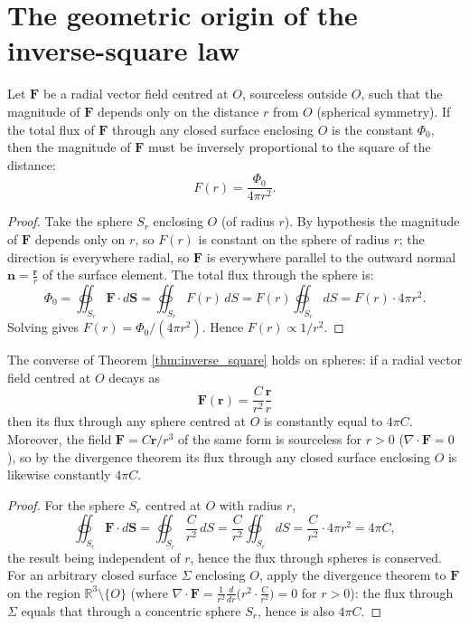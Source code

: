 \section{\texorpdfstring{The geometric origin of the inverse-square law}{The geometric origin of the inverse-square law}}

\begin{theorem}\label{thm:inverse_square}
Let $\mathbf{F}$ be a radial vector field centred at $O$, sourceless outside $O$, such that the magnitude of $\mathbf{F}$ depends only on the distance $r$ from $O$ (spherical symmetry). If the total flux of $\mathbf{F}$ through any closed surface enclosing $O$ is the constant $\Phi_0$, then the magnitude of $\mathbf{F}$ must be inversely proportional to the square of the distance:
\[F(r) = \frac{\Phi_0}{4\pi r^2}.\]
\end{theorem}

\begin{proof}
Take the sphere $S_r$ enclosing $O$ (of radius $r$). By hypothesis the magnitude of $\mathbf{F}$ depends only on $r$, so $F(r)$ is constant on the sphere of radius $r$; the direction is everywhere radial, so $\mathbf{F}$ is everywhere parallel to the outward normal $\mathbf{n} = \frac{\mathbf{r}}{r}$ of the surface element. The total flux through the sphere is:
\[\Phi_0 = \oiint_{S_r} \mathbf{F} \cdot d\mathbf{S} = \oiint_{S_r} F(r) \, dS = F(r) \oiint_{S_r} dS = F(r) \cdot 4\pi r^2.\]
Solving gives $F(r) = \Phi_0/(4\pi r^2)$. Hence $F(r) \propto 1/r^2$.
\end{proof}

\begin{corollary}\label{cor:inverse_square_converse}
The converse of Theorem \ref{thm:inverse_square} holds on spheres: if a radial vector field centred at $O$ decays as
\[\mathbf{F}(\mathbf{r}) = \frac{C}{r^2} \frac{\mathbf{r}}{r}\]
then its flux through any sphere centred at $O$ is constantly equal to $4\pi C$. Moreover, the field $\mathbf F=C\mathbf r/r^3$ of the same form is sourceless for $r>0$ ($\nabla\cdot\mathbf F=0$), so by the divergence theorem its flux through any closed surface enclosing $O$ is likewise constantly $4\pi C$.
\end{corollary}

\begin{proof}
For the sphere $S_r$ centred at $O$ with radius $r$,
\[\oiint_{S_r} \mathbf{F} \cdot d\mathbf{S} = \oiint_{S_r} \frac{C}{r^2} \, dS = \frac{C}{r^2} \oiint_{S_r} dS = \frac{C}{r^2} \cdot 4\pi r^2 = 4\pi C,\]
the result being independent of $r$, hence the flux through spheres is conserved. For an arbitrary closed surface $\Sigma$ enclosing $O$, apply the divergence theorem to $\mathbf F$ on the region $\mathbb{R}^3\setminus\{O\}$ (where $\nabla\cdot\mathbf F=\frac{1}{r^2}\frac{d}{dr}\bigl(r^2\cdot\frac{C}{r^2}\bigr)=0$ for $r>0$): the flux through $\Sigma$ equals that through a concentric sphere $S_r$, hence is also $4\pi C$.
\end{proof}

